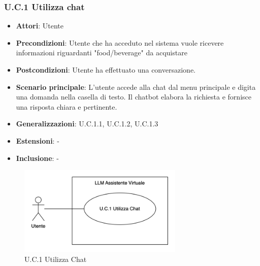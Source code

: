 \subsubsection{U.C.1 Utilizza chat}
\begin{itemize}
    \item \textbf{Attori}: Utente
    \item \textbf{Precondizioni}: Utente che ha acceduto nel sistema vuole ricevere informazioni riguardanti "food/beverage" da acquistare
    \item \textbf{Postcondizioni}: Utente ha effettuato una conversazione.
    \item \textbf{Scenario principale}: L'utente accede alla chat dal menu principale e digita una domanda nella casella di testo. Il chatbot elabora la richiesta e fornisce una risposta chiara e pertinente.
    \item \textbf{Generalizzazioni}: U.C.1.1, U.C.1.2, U.C.1.3
    \item \textbf{Estensioni}: -
    \item \textbf{Inclusione}: -
\end{itemize}
\begin{figure}[H]
    \centering
    \includegraphics[width=0.7\textwidth]{img/UC1.png}
    \caption{U.C.1 Utilizza Chat}
\end{figure}
\newpage

